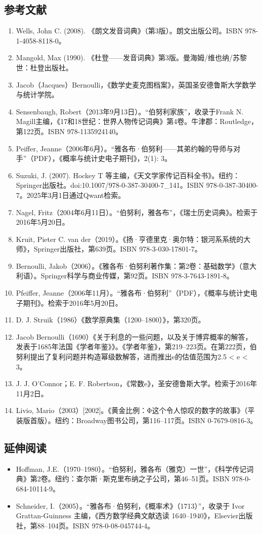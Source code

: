 \subsection{参考文献}
\begin{enumerate}
\item Wells, John C. (2008). 《朗文发音词典》（第3版）。朗文出版公司。ISBN 978-1-4058-8118-0。
\item Mangold, Max (1990). 《杜登——发音词典》第3版。曼海姆/维也纳/苏黎世：杜登出版社。
\item Jacob（Jacques）Bernoulli，《数学史麦克图档案》，英国圣安德鲁斯大学数学与统计学院。
\item Sensenbaugh, Robert（2013年9月13日）。“伯努利家族”，收录于Frank N. Magill主编，《17和18世纪：世界人物传记词典》第4卷。牛津郡：Routledge，第122页。ISBN 978-1135924140。
\item Peiffer, Jeanne（2006年6月）。“雅各布·伯努利——其弟约翰的导师与对手”（PDF），《概率与统计史电子期刊》，2(1): 3。
\item Suzuki, J. (2007). Hockey T 等主编，《天文学家传记百科全书》。纽约：Springer出版社。doi:10.1007/978-0-387-30400-7\_141。ISBN 978-0-387-30400-7。2025年3月1日通过Qwant检索。
\item Nagel, Fritz（2004年6月11日）。“伯努利，雅各布”，《瑞士历史词典》。检索于2016年5月20日。
\item Kruit, Pieter C. van der（2019）。《扬·亨德里克·奥尔特：银河系系统的大师》，Springer出版社，第639页。ISBN 978-3-030-17801-7。
\item Bernoulli, Jakob（2006）。《雅各布·伯努利著作集：第2卷：基础数学》（意大利语）。Springer科学与商业传媒，第92页。ISBN 978-3-7643-1891-8。
\item Pfeiffer, Jeanne（2006年11月）。“雅各布·伯努利”（PDF），《概率与统计史电子期刊》。检索于2016年5月20日。
\item D. J. Struik（1986）《数学原典集（1200–1800）》，第320页。
\item Jacob Bernoulli（1690）《关于利息的一些问题，以及关于博弈概率的解答，发表于1685年法国《学者年鉴》》。《学者年鉴》，第219–223页。在第222页，伯努利提出了复利问题并构造幂级数解答，进而推出e的估值范围为2.5 < e < 3。
\item J. J. O'Connor；E. F. Robertson，《常数e》，圣安德鲁斯大学。检索于2016年11月2日。
\item Livio, Mario（2003）[2002]。《黄金比例：Φ这个令人惊叹的数字的故事》（平装版首版）。纽约：Broadway图书公司，第116–117页。ISBN 0-7679-0816-3。
\end{enumerate}
\subsection{延伸阅读}
\begin{itemize}
\item Hoffman, J.E.（1970–1980）。“伯努利，雅各布（雅克）一世”，《科学传记词典》第2卷。纽约：查尔斯·斯克里布纳之子公司，第46–51页。ISBN 978-0-684-10114-9。
\item Schneider, I.（2005）。“雅各布·伯努利，《概率术》（1713）”，收录于 Ivor Grattan-Guinness 主编，《西方数学经典文献选读 1640–1940》，Elsevier出版社，第88–104页。ISBN 978-0-08-045744-4。
\end{itemize}

